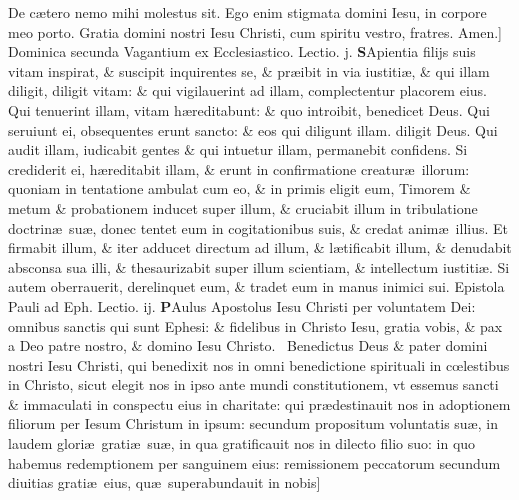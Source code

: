 \documentclass[a5paper,10pt]{book}
\def\rightmarginnote{%
	\lrmarginnote{\hskip\columnwidth \hskip -1em}}
\def\ae{æ}
\def\oe{œ}
\begin{document}
\begin{multicols*}{2}
De c\ae tero nemo mihi molestus sit. Ego enim stigmata domini Iesu, in corpore meo porto. Gratia domini nostri Iesu Christi, cum spiritu vestro, fratres. Amen.]
\newline {} \color{red} \hypertarget{SUN-SECVNDA-VAGAN}{Dominica} secunda Vagantium ex Ecclesiastico. \quad Lectio. j. \color{black}
\vspace{-.25em}
\lettrine[lines=2]{\bfseries S}{}Apientia\rightmarginnote{ca. 4.} filijs suis vitam inspirat, \& suscipit inquirentes se, \& pr\ae ibit in via iustiti\ae , \& qui illam diligit, diligit vitam: \& qui vigilauerint ad illam, complectentur placorem eius.
Qui tenuerint illam, vitam h\ae reditabunt: \& quo introibit, benedicet Deus. Qui seruiunt ei, obsequentes erunt sancto: \& eos qui diligunt illam. diligit Deus.
Qui audit illam, iudicabit gentes \& qui intuetur illam, permanebit confidens. Si crediderit ei, h\ae reditabit illam, \& erunt in confirmatione creatur\ae \ illorum: quoniam in tentatione ambulat cum eo, \& in primis eligit eum, Timorem \& metum \& probationem inducet super illum, \& cruciabit illum in tribulatione doctrin\ae \ su\ae , donec tentet eum in cogitationibus suis, \& credat anim\ae \ illius.
Et firmabit illum, \& iter adducet directum ad illum, \& l\ae tificabit illum, \& denudabit absconsa sua illi, \& thesaurizabit super illum scientiam, \& intellectum iustiti\ae .
Si autem oberrauerit, derelinquet eum, \& tradet eum in manus inimici sui.
\newline {} \color{red} Epistola Pauli ad Eph. \hfill Lectio. ij. \color{black}
\vspace{-.25em}
\lettrine[lines=2]{\bfseries \color{red} P}{}Aulus\rightmarginnote{ca. 1.} Apostolus Iesu Christi per voluntatem Dei: omnibus sanctis qui sunt Ephesi: \& fidelibus in Christo Iesu, gratia vobis, \& pax a Deo patre nostro, \& domino Iesu Christo. \textdagger \ 
Benedictus\rightmarginnote{A} Deus \& pater domini nostri Iesu Christi, qui benedixit nos in omni benedictione spirituali in c\oe lestibus in Christo, sicut elegit nos in ipso ante mundi constitutionem, vt essemus sancti \& immaculati in conspectu eius in charitate: qui pr\ae destinauit nos in adoptionem filiorum per Iesum Christum in ipsum: secundum propositum voluntatis su\ae , in laudem glori\ae \ grati\ae \ su\ae , in qua gratificauit nos in dilecto filio suo: in quo habemus redemptionem per sanguinem eius: remissionem peccatorum secundum diuitias grati\ae \ eius, qu\ae \ superabundauit in nobis]

\end{multicols*}
\end{document}
